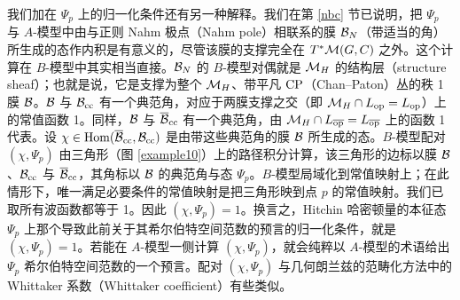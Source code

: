 我们加在 $\Psi_p$ 上的归一化条件还有另一种解释。我们在第 \ref{nbc} 节已说明，把 $\Psi_p$ 与 $A$-模型中由与正则 Nahm 极点（Nahm pole）相联系的膜 ${\mathcal B}_N$（带适当的角）所生成的态作内积是有意义的，尽管该膜的支撑完全在 $T^*{\mathcal M}(G,C)$ 之外。这个计算在 $B$-模型中其实相当直接。${\mathcal B}_N$ 的 $B$-模型对偶就是 ${\mathcal M}_H$ 的结构层（structure sheaf）；也就是说，它是支撑为整个 ${\mathcal M}_H$、带平凡 ${\mathrm{CP}}$（Chan–Paton）丛的秩 1 膜 ${\mathcal B}$。${\mathcal B}$ 与 ${\mathcal B}_{\mathrm{cc}}$ 有一个典范角，对应于两膜支撑之交（即 ${\mathcal M}_H\cap L_{\mathrm{op}}=L_{\mathrm{op}}$）上的常值函数 1。同样，${\mathcal B}$ 与 $\overline{{\mathcal B}}_{\mathrm{cc}}$ 有一个典范角，由 ${\mathcal M}_H\cap L_{{\overline{\mathrm{op}}}}=L_{{\overline{\mathrm{op}}}}$ 上的函数 1 代表。设 $\chi\in {\mathrm{Hom}}(\overline{{\mathcal B}}_{\mathrm{cc}},{\mathcal B}_{\mathrm{cc}})$ 是由带这些典范角的膜 ${\mathcal B}$ 所生成的态。$B$-模型配对 $(\chi,\Psi_p)$ 由三角形（图 \ref{example10}）上的路径积分计算，该三角形的边标以膜 ${\mathcal B}$、${\mathcal B}_{\mathrm{cc}}$ 与 $\overline{{\mathcal B}}_{{\mathrm{cc}}}$，其角标以 ${\mathcal B}$ 的典范角与态 $\Psi_p$。$B$-模型局域化到常值映射上；在此情形下，唯一满足必要条件的常值映射是把三角形映到点 $p$ 的常值映射。我们已取所有波函数都等于 1。因此 $(\chi,\Psi_p)=1$。换言之，Hitchin 哈密顿量的本征态 $\Psi_p$ 上那个导致此前关于其希尔伯特空间范数的预言的归一化条件，就是 $(\chi,\Psi_p)=1$。若能在 $A$-模型一侧计算 $(\chi,\Psi_p)$，就会纯粹以 $A$-模型的术语给出 $\Psi_p$ 希尔伯特空间范数的一个预言。配对 $(\chi,\Psi_p)$ 与几何朗兰兹的范畴化方法中的 Whittaker 系数（Whittaker coefficient）有些类似。
